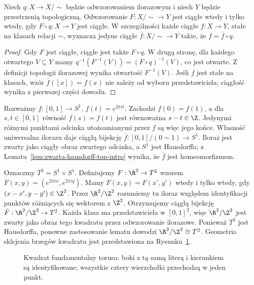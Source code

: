 \begin{twierdzenie}
Niech $q:X\to X/{\sim}$ będzie odwzorowaniem ilorazowym i niech $Y$ będzie
przestrzenią topologiczną. Odwzorowanie $F:X/{\sim}\to Y$ jest ciągłe wtedy
i tylko wtedy, gdy $F\circ q:X\to Y$ jest ciągłe.
W szczególności każde ciągłe $f:X\to Y$, stałe na klasach relacji $\sim$,
wyznacza jedyne ciągłe $\bar f:X/{\sim}\to Y$ takie, że $f=\bar f\circ q$.
\end{twierdzenie}
\begin{proof}
Gdy $F$ jest ciągłe, ciągłe jest także $F\circ q$. W drugą stronę,
dla każdego otwartego $V\subseteq Y$ mamy
$q^{-1}(F^{-1}(V))=(F\circ q)^{-1}(V)$, co jest otwarte.
Z definicji topologii ilorazowej wynika otwartość $F^{-1}(V)$.
Jeśli $f$ jest stałe na klasach, wzór $\bar f([x])=f(x)$ nie zależy od wyboru
przedstawiciela; ciągłość wynika z pierwszej części dowodu.
\end{proof}

\begin{przyklad}
\label{prz:iloraz-okragu-torusa-top-intro}
Rozważmy $f:[0,1]\to S^1$, $f(t)=e^{2\pi it}$.
Zachodzi $f(0)=f(1)$, a dla $s,t\in[0,1]$ równość
$f(s)=f(t)$ jest równoważna $s-t\in\Z$.
Jedynymi różnymi punktami odcinka utożsamianymi przez $f$
są więc jego końce. Własność uniwersalna ilorazu
daje ciągłą bijekcję
$\bar f:[0,1]/(0\sim1)\to S^1$.
Iloraz jest zwarty jako ciągły obraz zwartego odcinka,
a $S^1$ jest Hausdorffa; z Lematu~\ref{lem:zwarta-hausdorff-top-intro}
wynika, że $\bar f$ jest homeomorfizmem.

Oznaczmy $T^2=S^1\times S^1$. Definiujemy
$F:\R^2\to T^2$ wzorem $F(x,y)=(e^{2\pi ix},e^{2\pi iy})$.
Mamy $F(x,y)=F(x',y')$ wtedy i tylko wtedy, gdy
$(x-x',y-y')\in\Z^2$. Przez $\R^2/\Z^2$ rozumiemy tu
iloraz względem identyfikacji punktów różniących się
wektorem z $\Z^2$. Otrzymujemy ciągłą
bijekcję $\bar F:\R^2/\Z^2\to T^2$.
Każda klasa ma przedstawiciela w $[0,1]^2$,
więc $\R^2/\Z^2$ jest zwarty jako obraz tego
kwadratu przez odwzorowanie ilorazowe.
Ponieważ $T^2$ jest Hausdorffa, ponowne zastosowanie
lematu dowodzi $\R^2/\Z^2\cong T^2$.
Geometria sklejenia brzegów kwadratu
jest przedstawiona na Rysunku~\ref{fig:torus-iloraz-top-intro}.
\end{przyklad}

\begin{figure}[H]
\centering
{}
\caption{Kwadrat fundamentalny torusa: boki z tą samą literą
i kierunkiem są identyfikowane; wszystkie cztery wierzchołki
przechodzą w jeden punkt.}
\label{fig:torus-iloraz-top-intro}
\end{figure}

